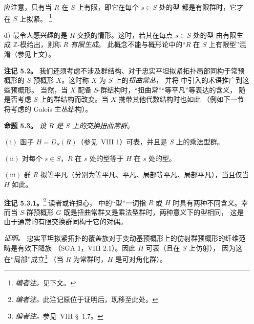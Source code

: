 应注意，只有当 \(R\) 在 \(S\) 上有限，即它在每个 \(s\in S\) 处的型
都是有限群时，它才在 \(S\) 上拟紧。
\footnote{\textit{编者注。}见下文。}

\smallskip
\noindent
d) 最令人感兴趣的是 \(R\) 交换的情形。这时，若其在每点 \(s\in S\) 处的型
由有限生成 \(\mathbb Z\)-模给出，则称 \(R\) \emph{有限生成}。
此概念不能与概形论中的“\(R\) 在 \(S\) 上有限型”混淆（参见上文）。
\par\endgroup

\par\medskip\noindent
\textbf{注记 5.2。}\enspace
我们还须考虑不涉及群结构、对于忠实平坦拟紧拓扑局部同构于常预概形的
\(S\)-预概形 \(X\)。这时称 \(X\) 为 \(S\) 上的\emph{扭曲常丛}，
并将  中引入的术语推广到这些预概形。
当然，当 \(X\) 配备 \(S\)-群结构时，“扭曲常”“等平凡”等表达的含义，
随是否考虑 \(S\) 上的群结构而改变。当 \(X\) 携带其他代数结构时也如此
（例如下一节将考虑的 Galois 主丛结构）。

\par\medskip\noindent
\textbf{命题 5.3。}\enspace
\begingroup\itshape
设 \(R\) 是 \(S\) 上的交换扭曲常群。

\smallskip
\noindent
\(\mathrm{(i)}\) 函子 \(H=D_S(R)\)（参见\ VIII 1）可表，并且是 \(S\) 上的乘法型群。

\smallskip
\noindent
\(\mathrm{(ii)}\) 对每个 \(s\in S\)，\(R\) 在 \(s\) 处的型等于 \(H\) 在 \(s\) 处的型。

\smallskip
\noindent
\(\mathrm{(iii)}\) 群 \(R\) 拟等平凡（分别为等平凡、平凡、局部等平凡、局部平凡），当且仅当 \(H\) 如此。
\par\endgroup

\par\medskip\noindent
\textbf{注记 5.3.1。}\footnote{\textit{编者注。}此注记原位于证明后，现移至此处。}\enspace
读者或许担心， 中的“型”一词指
\(R\) 或 \(H\) 时具有两种不同含义。幸而当 \(S\)-群预概形 \(G\)
既是扭曲常群又是乘法型群时，两种意义下的型相同，
这是由于通常的有限交换群同构于它的对偶。

\par\smallskip\noindent
\emph{证明。}
忠实平坦拟紧拓扑的覆盖族对于变动基预概形上的仿射群预概形的纤维范畴是有效下降族
（SGA 1，VIII 2.1）。因此 \(H\) 可表（且在 \(S\) 上仿射），
因为这在“局部”成立\footnote{\textit{编者注。}参见\ VIII \S~1.7。}
（当 \(R\) 为常群时，\(H\) 是可对角化群）。

